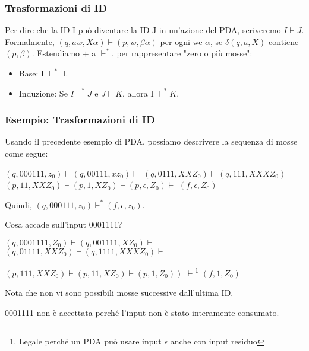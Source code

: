 \subsubsection{Trasformazioni di ID}

Per dire che la ID I può diventare la ID J in un'azione del PDA, scriveremo $I \vdash J$. Formalmente, $(q, a w, X \alpha) \vdash(p, w, \beta \alpha)$ per ogni we $\alpha$, se $\delta(q, a, X)$ contiene $(p, \beta)$. Estendiamo $+$ a $\vdash^{*}$, per rappresentare "zero o più mosse":
\begin{itemize}
    \item Base: I $\vdash^{*}$ I.
    \item Induzione: Se $I \vdash^{*} J$ e $J \vdash K$, allora I $\vdash^{*} K$.
\end{itemize}

\subsubsection{Esempio: Trasformazioni di ID}
Usando il precedente esempio di PDA, possiamo descrivere la sequenza di mosse come segue:

$\left(q, 000111, z_{0}\right)\vdash\left(q, 00111, x z_{0}\right)\vdash$
$\left(q, 0111, X X Z_{0}\right)\vdash\left(q, 111, X X X Z_{0}\right)\vdash$
$\left(p, 11, X X Z_{0}\right)\vdash\left(p, 1, X Z_{0}\right)\vdash\left(p, \epsilon, Z_{0}\right)\vdash$
$\left(f, \epsilon, Z_{0}\right)$

\vspace{5mm}

Quindi, $\left(q, 000111, z_{0}\right)\vdash^{*}\left(f, \epsilon, z_{0}\right)$.

Cosa accade sull'input 0001111?

\vspace{5mm}

$\left(q, 0001111, Z_{0}\right)\vdash\left(q, 001111, X Z_{0}\right)\vdash$
$\left(q, 01111, X X Z_{0}\right)\vdash\left(q, 1111, X X X Z_{0}\right)\vdash$

$\left.\left(p, 111, X X Z_{0}\right) \vdash \left(p, 11, X Z_{0}\right)\vdash\left(p, 1, Z_{0}\right)\right)$ $\vdash$\footnote{Legale perché un PDA può usare input $\epsilon$ anche con input residuo}
$\left(f, 1, Z_{0}\right)$

\vspace{5mm}

Nota che non vi sono possibili mosse successive dall'ultima ID. 

0001111 non è accettata perché l'input non è stato interamente consumato.

